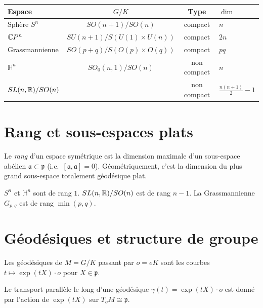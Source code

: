 \begin{formules}[title=\textbf{Exemples d'espaces sym\'etriques irr\'eductibles}]
\begin{center}
\renewcommand{\arraystretch}{1.3}
\begin{tabular}{lccl}
\hline
\textbf{Espace} & $G/K$ & \textbf{Type} & $\dim$ \\
\hline
Sph\`ere $S^n$ & $SO(n+1)/SO(n)$ & compact & $n$ \\
$\mathbb{C} P^n$ & $SU(n+1)/S(U(1) \times U(n))$ & compact & $2n$ \\
Grassmannienne & $SO(p+q)/S(O(p) \times O(q))$ & compact & $pq$ \\
$\mathbb{H}^n$ & $SO_0(n,1)/SO(n)$ & non compact & $n$ \\
$SL(n,\mathbb{R})/SO(n)$ & & non compact & $\frac{n(n+1)}{2}-1$ \\
\hline
\end{tabular}
\end{center}
\end{formules}

\section{Rang et sous-espaces plats}

\begin{definition}[Rang]
Le \emph{rang} d'un espace sym\'etrique est la dimension maximale d'un sous-espace
ab\'elien $\mathfrak{a} \subset \mathfrak{p}$ (i.e.\ $[\mathfrak{a}, \mathfrak{a}] = 0$).
G\'eom\'etriquement, c'est la dimension du plus grand sous-espace totalement
g\'eod\'esique plat.
\end{definition}

\begin{exemple}
$S^n$ et $\mathbb{H}^n$ sont de rang $1$. $SL(n,\mathbb{R})/SO(n)$ est de rang $n-1$.
La Grassmannienne $G_{p,q}$ est de rang $\min(p,q)$.
\end{exemple}

\section{G\'eod\'esiques et structure de groupe}

\begin{proposition}
Les g\'eod\'esiques de $M = G/K$ passant par $o = eK$ sont les courbes
$t \mapsto \exp(tX) \cdot o$ pour $X \in \mathfrak{p}$.
\end{proposition}

\begin{proposition}
Le transport parall\`ele le long d'une g\'eod\'esique $\gamma(t) = \exp(tX) \cdot o$
est donn\'e par l'action de $\exp(tX)$ sur $T_oM \cong \mathfrak{p}$.
\end{proposition}

